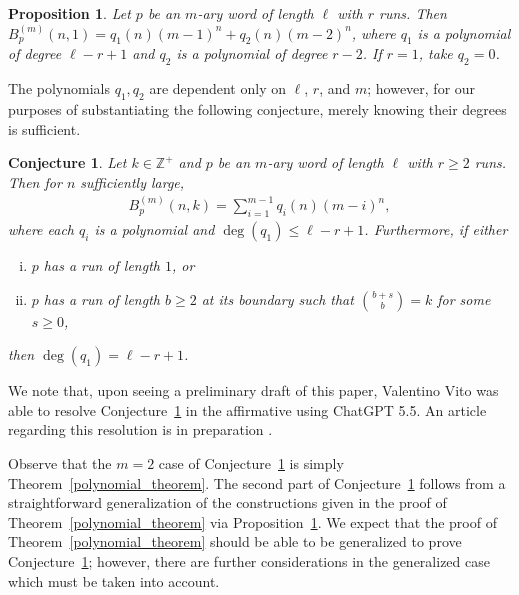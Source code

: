 \documentclass[11pt]{amsart}
\newtheorem{prop}[theorem]{Proposition}
\newtheorem{conj}{Conjecture}
\newcommand{\ZZ}{\mathbb{Z}}
\begin{document}
\begin{prop}\label{m_ary_k_1}
    Let $p$ be an $m$-ary word of length $\ell$ with $r$ runs. Then $B_p^{(m)}(n,1)=q_1(n)(m-1)^n+q_2(n)(m-2)^n$, where $q_1$ is a polynomial of degree $\ell-r+1$ and $q_2$ is a polynomial of degree $r-2$. If $r=1$, take $q_2=0$.
\end{prop}

The polynomials $q_1,q_2$ are dependent only on $\ell$, $r$, and $m$; however, for our purposes of substantiating the following conjecture, merely knowing their degrees is sufficient.

\begin{conj}\label{m_ary_polynomial_conj}
    Let $k\in\ZZ^+$ and $p$ be an $m$-ary word of length $\ell$ with $r\geq2$ runs. Then for $n$ sufficiently large, 
    \begin{align*}
        B^{(m)}_p(n,k)=\sum_{i=1}^{m-1}q_i(n)(m-i)^n,
    \end{align*}
    where each $q_i$ is a polynomial and $\deg(q_1)\leq\ell-r+1$. Furthermore, if either
    \begin{enumerate}[(i)]
        \item $p$ has a run of length $1$, or
        \item $p$ has a run of length $b\geq2$ at its boundary such that ${b+s\choose b}=k$ for some $s\geq0$,
    \end{enumerate}
    then $\deg(q_1)=\ell-r+1$.
\end{conj}

We note that, upon seeing a preliminary draft of this paper, Valentino Vito \cite{vito_communication} was able to resolve Conjecture~\ref{m_ary_polynomial_conj} in the affirmative using ChatGPT 5.5. An article regarding this resolution is in preparation \cite{vito_paper}.

Observe that the $m=2$ case of Conjecture~\ref{m_ary_polynomial_conj} is simply Theorem~\ref{polynomial_theorem}. The second part of Conjecture~\ref{m_ary_polynomial_conj} follows from a straightforward generalization of the constructions given in the proof of Theorem~\ref{polynomial_theorem} via Proposition~\ref{m_ary_k_1}. We expect that the proof of Theorem~\ref{polynomial_theorem} should be able to be generalized to prove Conjecture~\ref{m_ary_polynomial_conj}; however, there are further considerations in the generalized case which must be taken into account.
\end{document}
